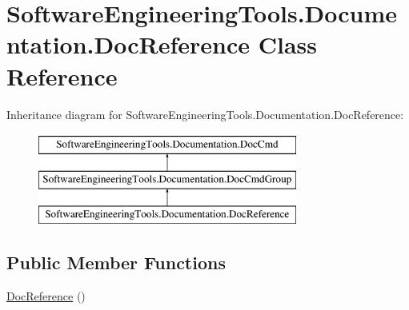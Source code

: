\hypertarget{class_software_engineering_tools_1_1_documentation_1_1_doc_reference}{\section{Software\+Engineering\+Tools.\+Documentation.\+Doc\+Reference Class Reference}
\label{class_software_engineering_tools_1_1_documentation_1_1_doc_reference}
}
Inheritance diagram for Software\+Engineering\+Tools.\+Documentation.\+Doc\+Reference\+:\begin{figure}[H]
\begin{center}
\leavevmode
\includegraphics[height=3.000000cm]{class_software_engineering_tools_1_1_documentation_1_1_doc_reference}
\end{center}
\end{figure}
\subsection*{Public Member Functions}
\begin{DoxyCompactItemize}
\item 
\hyperlink{class_software_engineering_tools_1_1_documentation_1_1_doc_reference_aff445cccc14cc2765824f67df8ea134a}{Doc\+Reference} ()
\end{DoxyCompactItemize}
